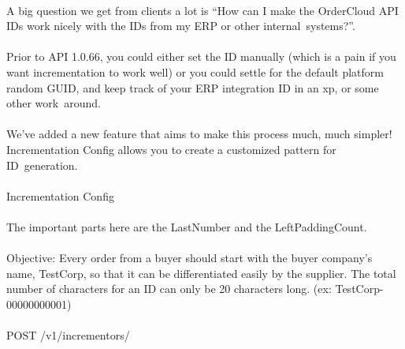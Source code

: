 \documentclass{memoir}%
\begin{document}
\paragraph*{}%

%
\paragraph*{}%
A big question we get from clients a lot is “How can I make the OrderCloud API IDs work nicely with the IDs from my ERP or other internal~systems?”. 

%
\paragraph*{}%
Prior to API 1.0.66, you could either set the ID manually (which is a pain if you want incrementation to work well) or you could settle for the default platform random GUID, and keep track of your ERP integration ID in an xp, or some other work~around.

%
\paragraph*{}%
We’ve added a new feature that aims to make this process much, much simpler! Incrementation Config allows you to create a customized pattern for ID~generation. 

%
\paragraph*{}%
Incrementation Config

%
\paragraph*{}%
The important parts here are the LastNumber and the LeftPaddingCount. 

%
\paragraph*{}%
Objective: Every order from a buyer should start with the buyer company’s name, TestCorp, so that it can be differentiated easily by the supplier. The total number of characters for an ID can only be 20 characters long. (ex: TestCorp{-}00000000001)

%
\paragraph*{}%
POST /v1/incrementors/
\end{document}
